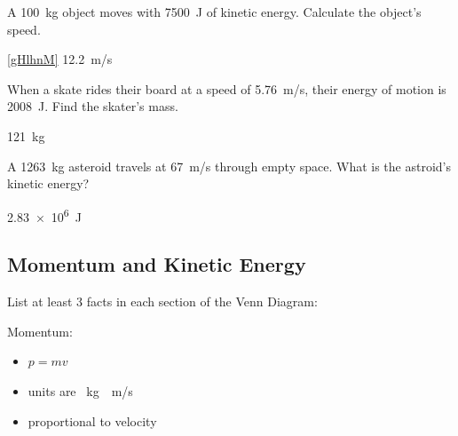 \documentclass[../main-physics-problems.tex]{subfiles}
\begin{document}
\begin{questions}
\question \label{gHlhnM}
A \SI{100}{kg} object moves with \SI{7500}{J} of kinetic energy. Calculate the object's speed.

\begin{solution}
\ref{gHlhnM} \SI{12.2}{m/s}
\end{solution}


\question \label{WH6xot}
When a skate rides their board at a speed of \SI{5.76}{m/s}, their energy of motion is \SI{2008}{J}. Find the skater's mass.

\begin{solution}
\SI{121}{kg}
\end{solution}

\question \label{X7RPxf}
A \SI{1263}{kg} asteroid travels at \SI{67}{m/s} through empty space. What is the astroid's kinetic energy?

\begin{solution}
\SI{2.83e6}{J}
\end{solution}

\clearpage
\begin{EnvUplevel}
    \subsection{Momentum and Kinetic Energy}
\end{EnvUplevel}

\question %
List at least 3 facts in each section of the Venn Diagram:

\begin{center}
\end{center}

\begin{solution}
\phantom{.}

Momentum:

\begin{itemize}[itemsep=0pt,topsep=0pt]
    \item $p=mv$
    \item units are \SI{}{kg\cdot m/s}
    \item proportional to velocity
\end{itemize}


\end{solution}
\end{questions}
\end{document}
